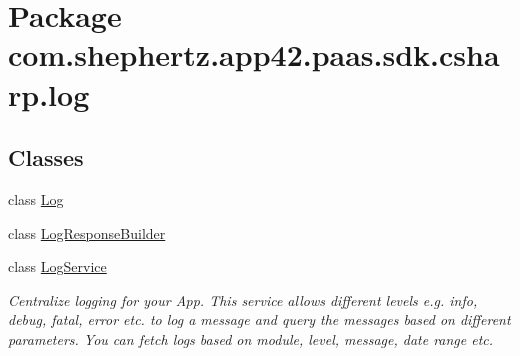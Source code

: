 \hypertarget{namespacecom_1_1shephertz_1_1app42_1_1paas_1_1sdk_1_1csharp_1_1log}{\section{Package com.\+shephertz.\+app42.\+paas.\+sdk.\+csharp.\+log}
\label{namespacecom_1_1shephertz_1_1app42_1_1paas_1_1sdk_1_1csharp_1_1log}
}
\subsection*{Classes}
\begin{DoxyCompactItemize}
\item 
class \hyperlink{classcom_1_1shephertz_1_1app42_1_1paas_1_1sdk_1_1csharp_1_1log_1_1_log}{Log}
\item 
class \hyperlink{classcom_1_1shephertz_1_1app42_1_1paas_1_1sdk_1_1csharp_1_1log_1_1_log_response_builder}{Log\+Response\+Builder}
\item 
class \hyperlink{classcom_1_1shephertz_1_1app42_1_1paas_1_1sdk_1_1csharp_1_1log_1_1_log_service}{Log\+Service}
\begin{DoxyCompactList}\small\item\em Centralize logging for your App. This service allows different levels e.\+g. info, debug, fatal, error etc. to log a message and query the messages based on different parameters. You can fetch logs based on module, level, message, date range etc. \end{DoxyCompactList}\end{DoxyCompactItemize}
